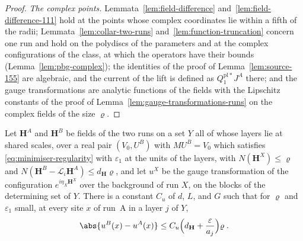 \begin{proof}
\emph{The complex points.} Lemmata~\ref{lem:field-difference} and~\ref{lem:field-difference-111} hold at the points whose complex coordinates lie within a fifth of the radii; Lemmata~\ref{lem:collar-two-runs} and~\ref{lem:function-truncation} concern one run and hold on the polydiscs of the parameters and at the complex configurations of the class, at which the operators have their bounds (Lemma~\ref{lem:pbg-complex}); the identities of the proof of Lemma~\ref{lem:source-155} are algebraic, and the current of the lift is defined as $Q^{\mathrm{pl}*}_1J^A$ there; and the gauge transformations are analytic functions of the fields with the Lipschitz constants of the proof of Lemma~\ref{lem:gauge-transformations-runs} on the complex fields of the size $\varrho$.
\end{proof}


\begin{lemma}\label{lem:gauge-transformations-runs}
Let $\mathbf H^A$ and $\mathbf H^B$ be fields of the two runs on a set $Y$ all of whose layers lie at shared scales, over a real pair $(V_0, U^B)$ with $MU^B = V_0$ which satisfies \eqref{eq:minimiser-regularity} with $\varepsilon_1$ at the units of the layers, with $N(\mathbf H^X) \leq \varrho$ and $N(\mathbf H^B - \mathcal L_\iota\mathbf H^A) \leq d_{\mathbf H}\varrho$, and let $u^X$ be the gauge transformation \cite[(106), p.~33]{BalabanAVG} of the configuration $e^{i\eta_X\mathbf H^X}$ over the background of run $X$, on the blocks of the determining set of $Y$. There is a constant $C_u$ of $d$, $L$, and $G$ such that for $\varrho$ and $\varepsilon_1$ small, at every site $x$ of run~A in a layer $j$ of $Y$,
\begin{equation}\label{eq:gauge-transformations-runs}
    \abs{u^B(x) - u^A(x)} \leq C_u\Bigl(d_{\mathbf H} + \frac{\varepsilon}{a_j}\Bigr)\varrho\;.
\end{equation}
\end{lemma}

